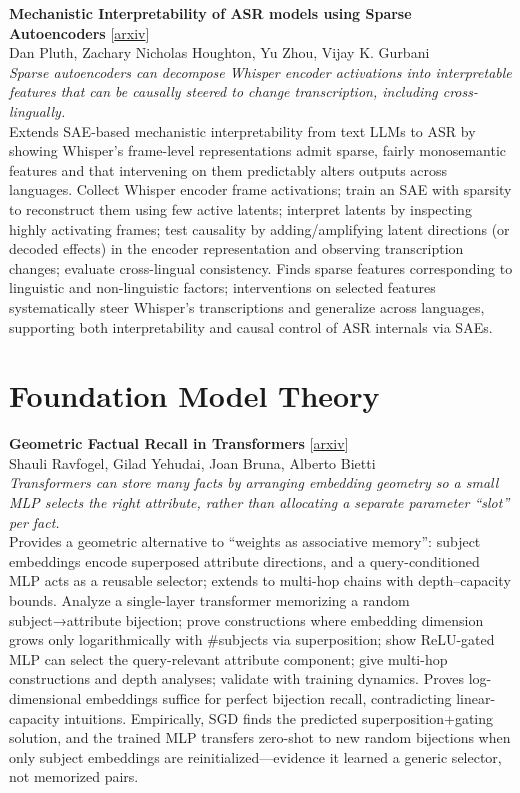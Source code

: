 \documentclass[12pt,letterpaper]{article}
\begin{document}
\medskip

{\small\textbf{Mechanistic Interpretability of ASR models using Sparse Autoencoders}} {\scriptsize[\href{https://arxiv.org/abs/2605.12225}{arxiv}]}\\
{\scriptsize Dan Pluth, Zachary Nicholas Houghton, Yu Zhou, Vijay K. Gurbani}\\

{\small\textit{Sparse autoencoders can decompose Whisper encoder activations into interpretable features that can be causally steered to change transcription, including cross-lingually.}}\\[1pt]
{\footnotesize Extends SAE-based mechanistic interpretability from text LLMs to ASR by showing Whisper's frame-level representations admit sparse, fairly monosemantic features and that intervening on them predictably alters outputs across languages. Collect Whisper encoder frame activations; train an SAE with sparsity to reconstruct them using few active latents; interpret latents by inspecting highly activating frames; test causality by adding/amplifying latent directions (or decoded effects) in the encoder representation and observing transcription changes; evaluate cross-lingual consistency. Finds sparse features corresponding to linguistic and non-linguistic factors; interventions on selected features systematically steer Whisper's transcriptions and generalize across languages, supporting both interpretability and causal control of ASR internals via SAEs.}

\medskip


\section*{Foundation Model Theory}

{\small\textbf{Geometric Factual Recall in Transformers}} {\scriptsize[\href{https://arxiv.org/abs/2605.12426}{arxiv}]}\\
{\scriptsize Shauli Ravfogel, Gilad Yehudai, Joan Bruna, Alberto Bietti}\\

{\small\textit{Transformers can store many facts by arranging embedding geometry so a small MLP selects the right attribute, rather than allocating a separate parameter ``slot'' per fact.}}\\[1pt]
{\footnotesize Provides a geometric alternative to ``weights as associative memory'': subject embeddings encode superposed attribute directions, and a query-conditioned MLP acts as a reusable selector; extends to multi-hop chains with depth--capacity bounds. Analyze a single-layer transformer memorizing a random subject→attribute bijection; prove constructions where embedding dimension grows only logarithmically with \#subjects via superposition; show ReLU-gated MLP can select the query-relevant attribute component; give multi-hop constructions and depth analyses; validate with training dynamics. Proves log-dimensional embeddings suffice for perfect bijection recall, contradicting linear-capacity intuitions. Empirically, SGD finds the predicted superposition+gating solution, and the trained MLP transfers zero-shot to new random bijections when only subject embeddings are reinitialized---evidence it learned a generic selector, not memorized pairs.}
\end{document}
